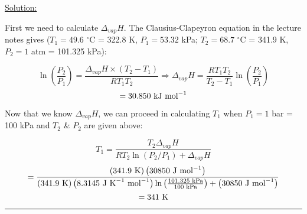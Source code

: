 \noindent
\underline{Solution:}

First we need to calculate $\Delta_{vap}H$. The Clausius-Clapeyron equation in the lecture notes gives ($T_1 = 49.6$ $^\circ$C = 322.8 K, $P_1 = 53.32$ kPa; $T_2 = 68.7$ $^\circ$C = 341.9 K, $P_2 = 1$ atm = 101.325 kPa):

$$\ln\left(\frac{P_2}{P_1}\right) = \frac{\Delta_{vap}H\times\left(T_2 - T_1\right)}{RT_1T_2} \Rightarrow \Delta_{vap}H = \frac{RT_1T_2}{T_2 - T_1}\ln\left(\frac{P_2}{P_1}\right)$$
$$ = 30.850\textnormal{ kJ mol}^{-1}$$

Now that we know $\Delta_{vap}H$, we can proceed in calculating $T_1$ when $P_1 = 1$ bar = 100 kPa and $T_2$ \& $P_2$ are given above:

$$T_1 = \frac{T_2\Delta_{vap}H}{RT_2\ln\left(P_2/P_1\right) + \Delta_{vap}H}$$
$$ = \frac{\left(341.9\textnormal{ K}\right)\left(30850\textnormal{ J mol}^{-1}\right)}{\left(341.9\textnormal{ K}\right)\left(8.3145\textnormal{ J K}^{-1}\textnormal{ mol}^{-1}\right)\ln\left(\frac{101.325\textnormal{ kPa}}{100\textnormal{ kPa}}\right) + \left(30850\textnormal{ J mol}^{-1}\right)}$$
$$ = 341\textnormal{ K}$$

\hrule\vspace{0.5cm}
